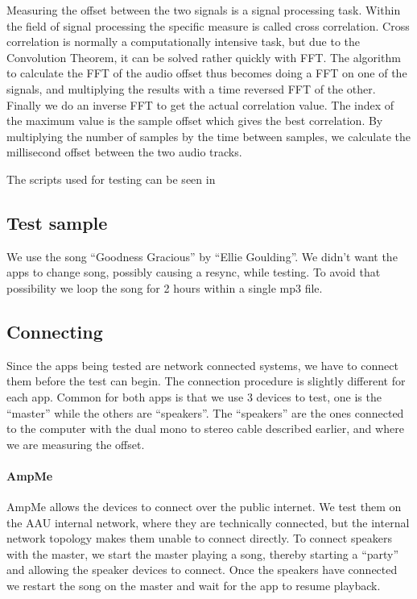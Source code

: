 Measuring the offset between the two signals is a signal processing
task. Within the field of signal processing the specific measure is
called cross correlation. Cross correlation is normally
a computationally intensive task, but due to the Convolution
Theorem\cite{conv_theo}, it can be solved rather quickly with \ac{FFT}.
The algorithm to calculate the \ac{FFT} of the audio offset thus becomes
doing a \ac{FFT} on one of the signals, and multiplying the results with
a time reversed \ac{FFT} of the other. Finally we do an inverse \ac{FFT}
to get the actual correlation value. The index of the maximum value is
the sample offset which gives the best correlation. By multiplying the
number of samples by the time between samples, we calculate the
millisecond offset between the two audio tracks.

The scripts used for testing can be seen in 

\subsection{Test sample}
We use the song ``Goodness Gracious'' by ``Ellie Goulding''.  We didn't
want the apps to change song, possibly causing a resync, while testing.
To avoid that possibility we loop the song for 2 hours within
a single mp3 file.

\subsection{Connecting}
Since the apps being tested are network connected systems, we have to
connect them before the test can begin. The connection procedure is
slightly different for each app. Common for both apps is that we use
3 devices to test, one is the ``master'' while the others are
``speakers''. The ``speakers'' are the ones connected to the computer
with the dual mono to stereo cable described earlier, and where we are
measuring the offset.

\paragraph{AmpMe}
AmpMe allows the devices to connect over the public internet. We test
them on the AAU internal network, where they are technically connected,
but the internal network topology makes them unable to connect directly.
To connect speakers with the master, we start the master playing a song,
thereby starting a ``party'' and allowing the speaker devices to
connect. Once the speakers have connected we restart the song on the
master and wait for the app to resume playback.

